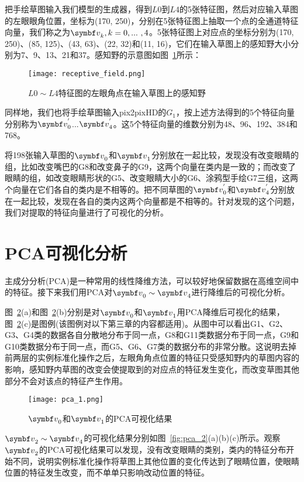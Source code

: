 把手绘草图输入我们模型的生成器，得到$L0$到$L4$的5张特征图，然后对应输入草图的左眼眼角位置，坐标为(170, 250)，分别在5张特征图上抽取一个点的全通道特征向量，我们称之为$\vv_k,k=0,...\ ,4$。5张特征图上对应点的坐标分别为(170, 250)、(85, 125)、(43, 63)、(22, 32)和(11, 16)，它们在输入草图上的感知野大小分别为7、9、13、21和37。感知野的示意图如图~\ref{fig:receptive}所示：
\begin{figure}[htb]
	\centering
	\texttt{[image: receptive\_field.png]}
	\caption{$L0\sim L4$特征图的左眼角点在输入草图上的感知野}
	\label{fig:receptive}
\end{figure}

同样地，我们也将手绘草图输入pix2pixHD的$G_1$，按上述方法得到的5个特征向量分别称为$\vv_0^{'}$...$\vv_4^{'}$。这5个特征向量的维数分别为48、96、192、384和768。

将198张输入草图的$\vv_0$和$\vv_1$分别放在一起比较，发现没有改变眼睛的组，比如改变嘴巴的G8和改变鼻子的G9，这两个向量在类内是一致的；而改变了眼睛的组，如改变眼睛形状的G5、改变眼睛大小的G6、涂鸦型手绘G7三组，这两个向量在它们各自的类内是不相等的。把不同草图的$\vv_0^{'}$和$\vv_4^{'}$分别放在一起比较，发现在各自的类内这两个向量都是不相等的。针对发现的这个问题，我们对提取的特征向量进行了可视化的分析。

\section{PCA可视化分析}

主成分分析(PCA)是一种常用的线性降维方法，可以较好地保留数据在高维空间中的特征。接下来我们用PCA对$\vv_0\sim \vv_4$进行降维后的可视化分析。

图~\ref{fig:pca_1}(a)和图~\ref{fig:pca_1}(b)分别是对$\vv_0$和$\vv_1$用PCA降维后可视化的结果，图~\ref{fig:pca_1}(c)是图例(该图例对以下第三章的内容都适用)。从图中可以看出G1、G2、G3、G4类的数据各自分散地分布于同一点，G8和G11类数据分布于同一点，G9和G10类数据分布于同一点，而G5、G6、G7类的数据分布的非常分散。这说明去掉前两层的实例标准化操作之后，左眼角角点位置的特征只受感知野内的草图内容的影响，感知野内草图的改变会使提取到的对应点的特征发生变化，而改变草图其他部分不会对该点的特征产生作用。
\begin{figure}[htb]
	\centering
	\texttt{[image: pca\_1.png]}
	\caption{$\vv_0$和$\vv_1$的PCA可视化结果}
	\label{fig:pca_1}
\end{figure}

$\vv_2 \sim \vv_4$的可视化结果分别如图~\ref{fig:pca_2}(a)(b)(c)所示。观察$\vv_2$的PCA可视化结果可以发现，没有改变眼睛的类别，类内的特征分布开始不同，说明实例标准化操作将草图上其他位置的变化传达到了眼睛位置，使眼睛位置的特征发生改变，而不单单只影响改动位置的特征。

